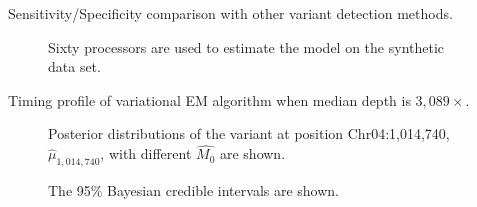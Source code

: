 \documentclass{bmcart}
\begin{document}
\begin{backmatter}
\begin{table}[h!]
\centering
\caption{Sensitivity/Specificity comparison with other variant detection methods.}\label{table:character}
\end{table}%

\begin{figure}[h!]
\centering
\caption{
Sixty processors are used to estimate the model on the synthetic data set.}\label{figure:timing}
\end{figure}

\begin{table}[h!]
\centering
\caption{Timing profile of variational EM algorithm when median depth is $3,089\times$.}\label{table:timing}
\end{table}%

\vspace{1em}

\begin{figure}[h!]
\centering
\caption{
Posterior distributions of the variant at position Chr04:1,014,740, $\hat{\mu}_{1,014,740}$, with different $\hat{M_0}$ are shown.}
\label{tbl:M0}
\end{figure}

\vspace{1em}

\begin{figure}[h!]
\centering
\caption{
The 95\% Bayesian credible intervals are shown.}
\label{figure:concomitant}
\end{figure}


\setcounter{figure}{0}
\setcounter{table}{0}


\end{backmatter}
\end{document}
